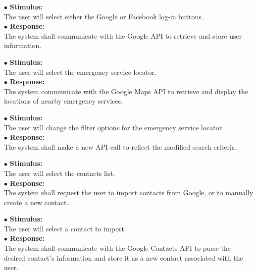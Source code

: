 \documentclass{scrreprt}
\begin{document}
\vspace{5mm}
	\hspace{-4.75mm} $\bullet$ \textbf{Stimulus:} \\ \hspace{5mm} The user will select either the Google or Facebook log-in buttons.\\
	$\bullet$ \textbf{Response:} \\ \hspace{5mm} The system shall communicate with the Google API to retrieve and store user information.

\vspace{5mm}
	\hspace{-4.75mm} $\bullet$ \textbf{Stimulus:} \\ \hspace{5mm} The user will select the emergency service locator.\\
	$\bullet$ \textbf{Response:} \\ \hspace{5mm} The system communicate with the Google Maps API to retrieve and display the locations of nearby emergency services.

\vspace{5mm}
	\hspace{-4.75mm} $\bullet$ \textbf{Stimulus:} \\ \hspace{5mm} The user will change the filter options for the emergency service locator.\\
	$\bullet$ \textbf{Response:} \\ \hspace{5mm} The system shall make a new API call to reflect the modified search criteria.

\vspace{5mm}
	\hspace{-4.75mm} $\bullet$ \textbf{Stimulus:} \\ \hspace{5mm} The user will select the contacts list.\\
	$\bullet$ \textbf{Response:} \\ \hspace{5mm} The system shall request the user to import contacts from Google, or to manually create a new contact.
\newpage

\vspace{5mm}
	\hspace{-4.75mm} $\bullet$ \textbf{Stimulus:} \\ \hspace{5mm} The user will select a contact to import.\\
	$\bullet$ \textbf{Response:} \\ \hspace{5mm} The system shall communicate with the Google Contacts API to parse the desired contact's information and store it as a new contact associated with the user.
\end{document}
